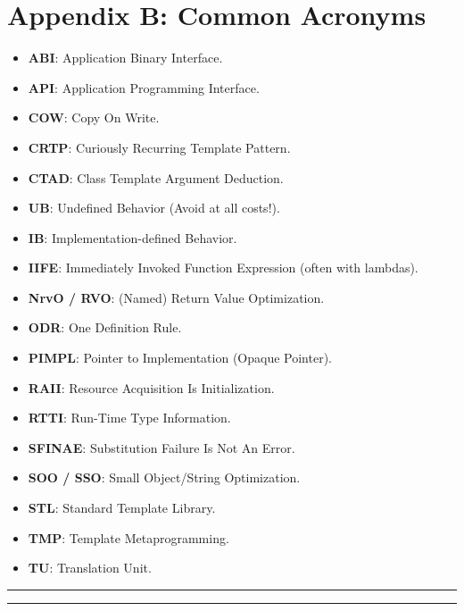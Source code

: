 \hypertarget{appendix-b-common-acronyms}{%
\chapter{Appendix B: Common Acronyms}\label{appendix-b-common-acronyms}}

\begin{itemize}
\tightlist
\item
  \textbf{ABI}: Application Binary Interface.
\item
  \textbf{API}: Application Programming Interface.
\item
  \textbf{COW}: Copy On Write.
\item
  \textbf{CRTP}: Curiously Recurring Template Pattern.
\item
  \textbf{CTAD}: Class Template Argument Deduction.
\item
  \textbf{UB}: Undefined Behavior (Avoid at all costs!).
\item
  \textbf{IB}: Implementation-defined Behavior.
\item
  \textbf{IIFE}: Immediately Invoked Function Expression (often with
  lambdas).
\item
  \textbf{NrvO / RVO}: (Named) Return Value Optimization.
\item
  \textbf{ODR}: One Definition Rule.
\item
  \textbf{PIMPL}: Pointer to Implementation (Opaque Pointer).
\item
  \textbf{RAII}: Resource Acquisition Is Initialization.
\item
  \textbf{RTTI}: Run-Time Type Information.
\item
  \textbf{SFINAE}: Substitution Failure Is Not An Error.
\item
  \textbf{SOO / SSO}: Small Object/String Optimization.
\item
  \textbf{STL}: Standard Template Library.
\item
  \textbf{TMP}: Template Metaprogramming.
\item
  \textbf{TU}: Translation Unit.
\end{itemize}

\begin{center}\rule{0.5\linewidth}{0.5pt}\end{center}

\begin{center}\rule{0.5\linewidth}{0.5pt}\end{center}
